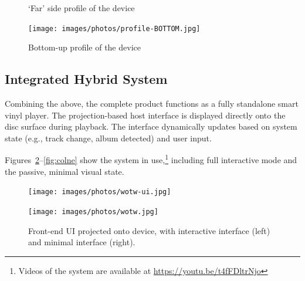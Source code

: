 \begin{figure}[H]
\begin{minipage}[b]{0.225\textwidth}
                    \caption{`Far' side profile of the device}
                    \label{fig:side2}
                \end{minipage}
                \hfill
                \begin{minipage}[b]{0.45\textwidth}
                    \centering
                    \texttt{[image: images/photos/profile-BOTTOM.jpg]}
                    \caption{Bottom-up profile of the device}
                    \label{fig:bottom}
                \end{minipage}
            \end{figure}
    
        \subsection{Integrated Hybrid System}
    
            Combining the above, the complete product functions as a fully standalone smart vinyl player. The projection-based host interface is displayed directly onto the disc surface during playback. The interface dynamically updates based on system state (e.g., track change, album detected) and user input.
    
            Figures~\ref{fig:wotw}–\ref{fig:colne} show the system in use,\footnote{Videos of the system are available at \url{https://youtu.be/t4fFDltrNjo}} including full interactive mode and the passive, minimal visual state.
    
            \begin{figure}[h]
                \centering
                \begin{minipage}[b]{0.45\textwidth}
                    \centering
                    \texttt{[image: images/photos/wotw-ui.jpg]}
                \end{minipage}
                \hfill
                \begin{minipage}[b]{0.45\textwidth}
                    \centering
                    \texttt{[image: images/photos/wotw.jpg]}
                \end{minipage}
                \caption{Front-end UI projected onto device, with interactive interface (left) and minimal interface (right).}
                \label{fig:wotw}
            \end{figure}
            
